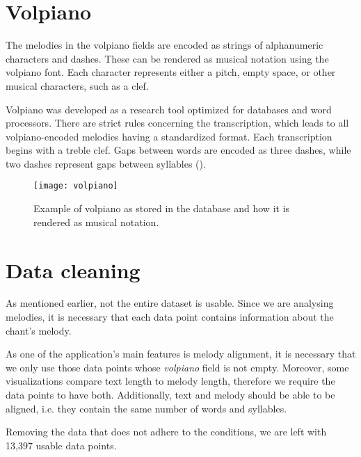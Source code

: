\section{Volpiano}

The melodies in the volpiano fields are encoded as strings of alphanumeric characters and dashes. These can be rendered as musical notation using
the volpiano font. Each character represents either a pitch, empty space, or other musical characters, such as a clef.

Volpiano was developed as a research tool optimized for databases and word processors. There are strict rules concerning the transcription, which leads
to all volpiano-encoded melodies having a standardized format. Each transcription begins with a treble clef. Gaps between words are encoded as three
dashes, while two dashes represent gaps between syllables (\cite{volpiano}).

\begin{figure}[h]
\centering
\texttt{[image: volpiano]}
\caption{Example of volpiano as stored in the database and how it is rendered as musical notation. \cite[Figure~2]{cantus_lacoste}}
\end{figure}

\section{Data cleaning}

As mentioned earlier, not the entire dataset is usable. Since we are analysing melodies, it is necessary that each data point contains information
about the chant's melody.

As one of the application's main features is melody alignment, it is necessary that we only use those data points whose \emph{volpiano} field is
not empty. Moreover, some visualizations compare text length to melody length, therefore we require the data points to have both. Additionally, 
text and melody should be able to be aligned, i.e. they contain the same number of words and syllables.

Removing the data that does not adhere to the conditions, we are left with 13,397 usable data points.

